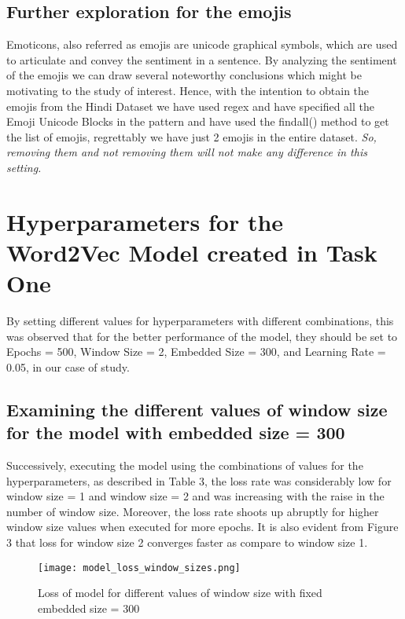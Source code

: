 \documentclass{article}
\begin{document}
\subsection{Further exploration for the emojis}
Emoticons, also referred as emojis are unicode graphical symbols, which are used to articulate and convey the sentiment in a sentence. By analyzing the sentiment of the emojis we can draw several noteworthy conclusions which might be motivating to the study of interest. 
Hence, with the intention to obtain the emojis from the Hindi Dataset we have used regex and have specified all the Emoji Unicode Blocks in the pattern and have used the findall() method to get the list of emojis, regrettably we have just 2 emojis in the entire dataset. \textit{So, removing them and not removing them will not make any difference in this setting.  }

\section{Hyperparameters for the Word2Vec Model created in Task One}
\label{others}

By setting different values for hyperparameters with different combinations, this was observed that for the better performance of the model, they should be set to Epochs = 500, Window Size = 2, Embedded Size = 300, and Learning Rate = 0.05, in our case of study.


\subsection{Examining the different values of window size for the model with embedded size = 300}

Successively, executing the model using the combinations of values for the hyperparameters, as described in Table 3, the loss rate was considerably low for window size = 1 and window size = 2 and was increasing with the raise in the number of window size. Moreover, the loss rate shoots up abruptly for higher window size values when executed for more epochs. It is also evident from Figure 3 that loss for window size 2 converges faster as compare to window size 1. 

\begin{figure}
  \centering
  \texttt{[image: model\_loss\_window\_sizes.png]}
  \caption{Loss of model for different values of window size with fixed embedded size = 300}
\end{figure}
\end{document}

